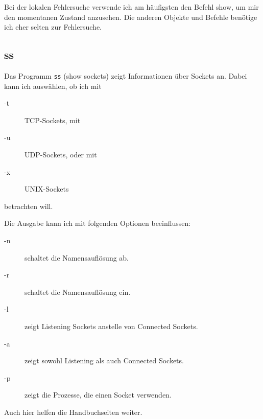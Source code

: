 \begin{normaltext}
  Bei der lokalen Fehlersuche verwende ich am häufigsten den Befehl show, um
  mir den momentanen Zustand anzusehen. Die anderen Objekte und Befehle
  benötige ich eher selten zur Fehlersuche.

  \subsection*{ss}

  Das Programm \verb?ss? (show sockets) zeigt Informationen über Sockets an.
  Dabei kann ich auswählen, ob ich mit
  \begin{description}
    \item[-t] TCP-Sockets, mit
    \item[-u] UDP-Sockets, oder mit
    \item[-x] UNIX-Sockets
  \end{description}
  betrachten will.

  Die Ausgabe kann ich mit folgenden Optionen beeinflussen:
  \begin{description}
    \item[-n] schaltet die Namensauflösung ab.
    \item[-r] schaltet die Namensauflösung ein.
    \item[-l] zeigt Listening Sockets anstelle von Connected Sockets.
    \item[-a] zeigt sowohl Listening als auch Connected Sockets.
    \item[-p] zeigt die Prozesse, die einen Socket verwenden.
  \end{description}

  Auch hier helfen die Handbuchseiten weiter.
\end{normaltext}

